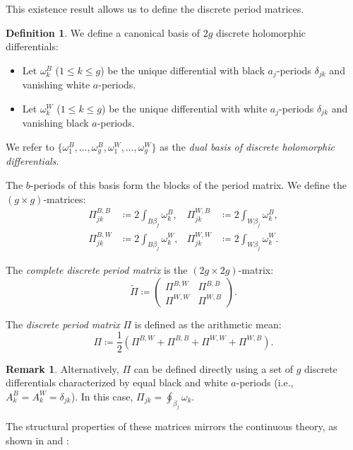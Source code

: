 \documentclass[11pt,a4paper]{article}
\theoremstyle{definition}
\newtheorem*{definition}{Definition}
\newtheorem*{remark}{Remark}
\begin{document}
This existence result allows us to define the discrete period matrices.

\begin{definition}\label{def:discrete_period_matrix}
	We define a canonical basis of $2g$ discrete holomorphic differentials:
	\begin{itemize}
		\item Let $\omega_k^B$ ($1 \leq k \leq g$) be the unique differential with black $a_j$-periods $\delta_{jk}$ and vanishing white $a$-periods.
		\item Let $\omega_k^W$ ($1 \leq k \leq g$) be the unique differential with white $a_j$-periods $\delta_{jk}$ and vanishing black $a$-periods.
	\end{itemize}
	We refer to $\{\omega_1^B, \dots, \omega_g^B, \omega_1^W, \dots, \omega_g^W\}$ as the \textit{dual basis of discrete holomorphic differentials}.
	
	The $b$-periods of this basis form the blocks of the period matrix. We define the $(g \times g)$-matrices:
	\begin{align*}
		\Pi^{B,B}_{jk} &\coloneq 2\int_{B\beta_j}\omega^B_k, & \Pi^{W,B}_{jk} &\coloneq 2\int_{W\beta_j}\omega^B_k,\\
		\Pi^{B,W}_{jk} &\coloneq 2\int_{B\beta_j}\omega^W_k, & \Pi^{W,W}_{jk} &\coloneq 2\int_{W\beta_j}\omega^W_k.
	\end{align*}
	
	The \textit{complete discrete period matrix} is the $(2g\times 2g)$-matrix:
	\[ \tilde{\Pi} \coloneq \begin{pmatrix} \Pi^{B,W} & \Pi^{B,B}\\ \Pi^{W,W} & \Pi^{W,B}\end{pmatrix}. \]
	
	The \textit{discrete period matrix} $\Pi$ is defined as the arithmetic mean:
	\[ \Pi \coloneq \frac{1}{2}(\Pi^{B,W} + \Pi^{B,B} + \Pi^{W,W} + \Pi^{W,B}). \]
\end{definition}

\begin{remark}
	Alternatively, $\Pi$ can be defined directly using a set of $g$ discrete differentials characterized by equal black and white $a$-periods (i.e., $A^B_k = A^W_k = \delta_{jk}$). In this case, $\Pi_{jk} = \oint_{\beta_j} \omega_k$.
\end{remark}

The structural properties of these matrices mirrors the continuous theory, as shown in \cite{BoG17} and \cite{G23}:
\end{document}
